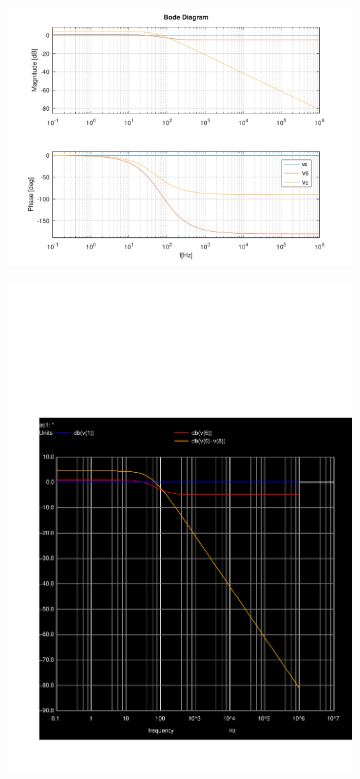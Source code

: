 \begin{figure}[ht]
\centering
\begin{subfigure}{.45\textwidth}
  \centering
  \includegraphics[width=\linewidth]{../mat/t2-t6.pdf}
\end{subfigure}%
\begin{subfigure}{.25\textwidth}
  \centering
  \includegraphics[width=\linewidth]{../sim/db.pdf}

\end{subfigure}
\end{figure}
